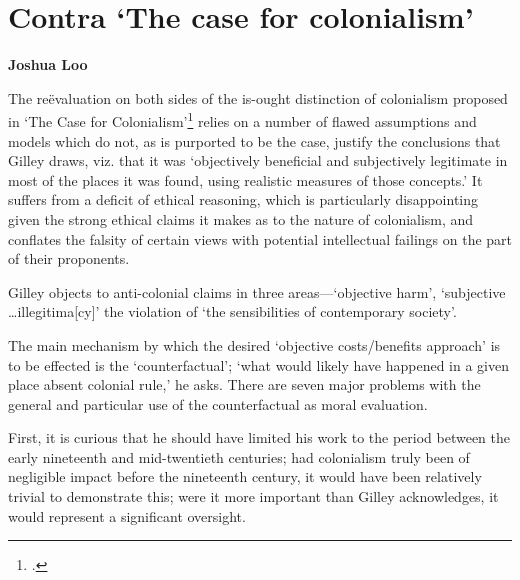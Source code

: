 \chapter{Contra `The case for colonialism'}

\textbf{Joshua Loo}

\begin{multicols}{2}

The reëvaluation on both sides of the is-ought distinction of colonialism
proposed in `The Case for Colonialism'\footcite{gilley} relies on a number of flawed assumptions and models which do not, as is purported to be the case, justify the conclusions that Gilley draws, viz. that it was `objectively beneficial and subjectively legitimate in most of the places it was found, using realistic measures of those concepts.' It suffers from a deficit of ethical reasoning, which is particularly disappointing given the strong ethical claims it makes as to the nature of colonialism, and conflates the falsity of certain views with potential intellectual failings on the part of their proponents.

Gilley objects to anti-colonial claims in three areas---`objective harm', `subjective \ldots illegitima[cy]' the violation of `the sensibilities of contemporary society'.

The main mechanism by which the desired `objective costs/benefits approach' is to be effected is the `counterfactual'; `what would likely have happened in a given place absent colonial rule,' he asks. There are seven major problems with the general and particular use of the counterfactual as moral evaluation.

First, it is curious that he should have limited his work to the period between the early nineteenth and mid-twentieth centuries; had colonialism truly been of negligible impact before the nineteenth century, it would have been relatively trivial to demonstrate this; were it more important than Gilley acknowledges, it would represent a significant oversight.


\end{multicols}
